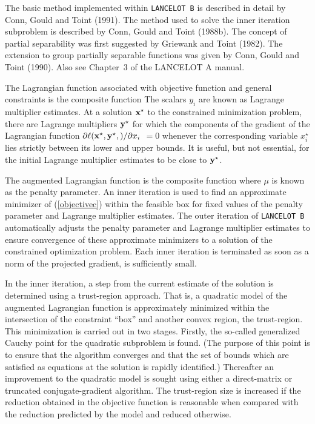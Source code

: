 \documentclass{galahad}
\newcommand{\packagename}{LANCELOT B}
\newcommand{\calG}{{\cal G}}
\begin{document}

\galmethod
The basic method implemented within {\tt \packagename} is described in
detail by Conn, Gould and Toint (1991).  The method used to solve the
inner iteration subproblem is described by Conn, Gould and Toint
(1988b). The concept of partial separability was first suggested by
Griewank and Toint (1982).  The extension to group partially separable
functions was given by Conn, Gould and Toint (1990).  Also see Chapter~3
of the {\sf LANCELOT A} manual.

The Lagrangian function associated with objective function
 and general constraints  is the
composite function \disp{\ell( \bmx, \bmy ) = f(\bmx) + \sum_{i \in
\calG_C} y_i c_i (\bmx).}  The scalars $y_i$ are known as Lagrange
multiplier estimates.  At a solution ${\mathbf{x}}^{\star}$ to the constrained
minimization problem, there are Lagrange multipliers ${\mathbf{y}}^{\star}$ for
which the components of the gradient of the Lagrangian function
$\partial \ell({\mathbf{x}}^{\star}, {\mathbf{y}}^{\star},) / \partial x_i$ $= 0$ whenever
the corresponding variable $x_i^{\star}$ lies strictly between its lower
and upper bounds.  It is useful, but not essential, for the initial
Lagrange multiplier estimates to be close to ${\mathbf{y}}^{\star}$.

The augmented Lagrangian function is the composite function
\eqn{objectivec}{\phi( \bmx, \bmy, \mu ) = \ell( \bmx, \bmy) +
 \frac{1}{2 \mu} \sum_{i \in \calG_C} (c_i (\bmx))^2,}
where $\mu$ is known as the penalty parameter.  An inner iteration is
used to find an approximate minimizer of (\ref{objectivec}) within the
feasible box for fixed values of the penalty parameter and Lagrange
multiplier estimates. The outer iteration of {\tt \packagename}
automatically adjusts the penalty parameter and Lagrange multiplier
estimates to ensure convergence of these approximate minimizers to a
solution of the constrained optimization problem. Each inner iteration
is terminated as soon as a norm of the projected gradient,
is sufficiently small.

In the inner iteration, a step from the current estimate of the solution
is determined using a trust-region approach.  That is, a quadratic model
of the augmented Lagrangian function is approximately minimized within
the intersection of the constraint ``box'' and another convex region,
the trust-region.  This minimization is carried out in two stages.
Firstly, the so-called generalized Cauchy point for the quadratic
subproblem is found.  (The purpose of this point is to ensure that the
algorithm converges and that the set of bounds which are satisfied as
equations at the solution is rapidly identified.)  Thereafter an
improvement to the quadratic model is sought using either a
direct-matrix or truncated conjugate-gradient algorithm. The
trust-region size is increased if the reduction obtained in the
objective function is reasonable when compared with the reduction
predicted by the model and reduced otherwise.
\end{document}
